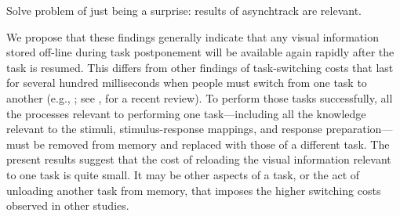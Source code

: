 \documentclass[jou,nobf]{apa}
\begin{document}
Solve problem of just being a surprise: results of asynchtrack
\cite{HorowitzBirnkrant2006} are relevant.

We propose that these findings generally indicate that any visual
information stored off-line during task postponement will be available
again rapidly after the task is resumed.  This differs from other findings
of task-switching costs that last for several hundred milliseconds when
people must switch from one task to another (e.g.,
; see
, for a recent review).  To perform those tasks
successfully, all the processes relevant to performing one task---including
all the knowledge relevant to the stimuli, stimulus-response mappings, and
response preparation---must be removed from memory and replaced with those
of a different task.  The present results suggest that the cost of
reloading the visual information relevant to one task is quite small.  It
may be other aspects of a task, or the act of unloading another task from
memory, that imposes the higher switching costs observed in other studies.


\end{document}
